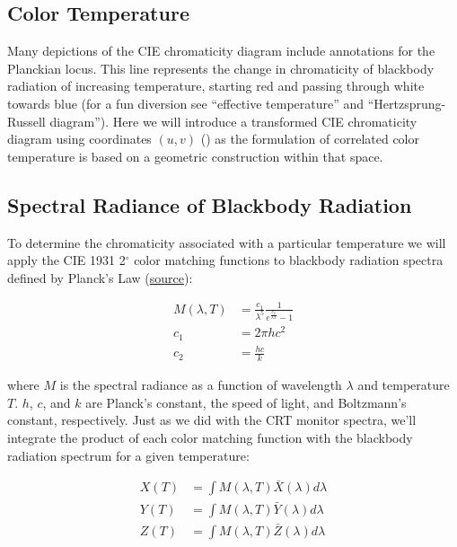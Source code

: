 \documentclass{article}
\begin{document}
\begin{multicols}{2}

\section{Color Temperature} \label{sec:color_temperature}

Many depictions of the CIE chromaticity diagram include annotations for the Planckian locus.  This line represents the change in chromaticity of blackbody radiation of increasing temperature, starting red and passing through white towards blue (for a fun diversion see “effective temperature” and “Hertzsprung-Russell diagram”).  Here we will introduce a transformed CIE chromaticity diagram using coordinates $(u,v)$ (\cite{cie_1960}) as the formulation of correlated color temperature is based on a geometric construction within that space.

\subsection{Spectral Radiance of Blackbody Radiation} %

To determine the chromaticity associated with a particular temperature we will apply the CIE 1931 2$^\circ$ color matching functions to blackbody radiation spectra defined by Planck’s Law (\href{https://en.wikipedia.org/wiki/Planckian_locus}{source}):

\begin{equation} %
    \begin{aligned}
        M(\lambda,T)&=\frac{c_1}{\lambda^5}\frac{1}{e^{\frac{c_2}{\lambda T}}-1}\\
        c_1&=2\pi hc^2\\
        c_2&=\frac{hc}{k}
    \end{aligned}
\end{equation}

where $M$ is the spectral radiance as a function of wavelength $\lambda$ and temperature $T$.  $h$, $c$, and $k$ are Planck's constant, the speed of light, and Boltzmann's constant, respectively.  Just as we did with the CRT monitor spectra, we'll integrate the product of each color matching function with the blackbody radiation spectrum for a given temperature:

\begin{equation} %
    \begin{aligned}
        X(T)&=\int M(\lambda,T)\bar{X}(\lambda)d\lambda\\
        Y(T)&=\int M(\lambda,T)\bar{Y}(\lambda)d\lambda\\
        Z(T)&=\int M(\lambda,T)\bar{Z}(\lambda)d\lambda
    \end{aligned}
\end{equation}


\end{multicols}
\end{document}
